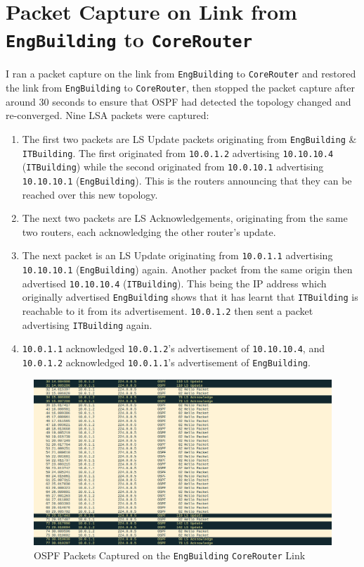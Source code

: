 \documentclass[a4paper]{article}
\begin{document}
\section{Packet Capture on Link from \texttt{EngBuilding} to \texttt{CoreRouter}}
I ran a packet capture on the link from \texttt{EngBuilding} to \texttt{CoreRouter} and restored the link from 
\verb|EngBuilding| to \verb|CoreRouter|, then stopped the packet capture after around 30 seconds to ensure that OSPF had 
detected the topology changed and re-converged.
Nine LSA packets were captured:
\begin{enumerate}
    \item   The first two packets are LS Update packets originating from \verb|EngBuilding| \& \verb|ITBuilding|.
    The first originated from \verb|10.0.1.2| advertising \verb|10.10.10.4| (\verb|ITBuilding|) while the second originated 
    from \verb|10.0.10.1| advertising \verb|10.10.10.1| (\verb|EngBuilding|).
    This is the routers announcing that they can be reached over this new topology.

    \item   The next two packets are LS Acknowledgements, originating from the same two routers, each acknowledging the 
            other router's update.

    \item   The next packet is an LS Update originating from \verb|10.0.1.1| advertising \verb|10.10.10.1| (\verb|EngBuilding|)
            again.
            Another packet from the same origin then advertised \verb|10.10.10.4| (\verb|ITBuilding|).
            This being the IP address which originally advertised \verb|EngBuilding| shows that it has learnt that \verb|ITBuilding| 
            is reachable to it from its advertisement.
            \verb|10.0.1.2| then sent a packet advertising \verb|ITBuilding| again.

    \item   \verb|10.0.1.1| acknowledged \verb|10.0.1.2|'s advertisement of \verb|10.10.10.4|, and \verb|10.0.1.2| 
            acknowledged \verb|10.0.1.1|'s advertisement of \verb|EngBuilding|.
\end{enumerate}

\begin{figure}[H]
    \centering
    \includegraphics[width=\textwidth]{./images/pcap.png}
    \caption{OSPF Packets Captured on the \texttt{EngBuilding} {\leftrightarrow} \texttt{CoreRouter} Link}
\end{figure}
\end{document}
